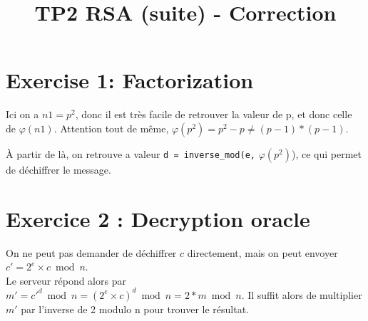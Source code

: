 \documentclass[english,a4paper,11pt,fleqn]{exam}
\title{\textbf{TP2 RSA (suite) - Correction}}
\begin{document}
	
	\section*{Exercise 1: Factorization}
	
	Ici on a $n1 = p^2$, donc il est très facile de retrouver la valeur de p, et donc celle de $\varphi(n1)$.
	Attention tout de même, $\varphi(p^2) = p^2 - p\neq (p-1)*(p-1)$.

	À partir de là, on retrouve a valeur \texttt{d = inverse\_mod(e,}  $\varphi(p^2)$), ce qui permet de déchiffrer le message.
	
	\section*{Exercice 2 : Decryption oracle}

	On ne peut pas demander de déchiffrer $c$ directement, mais on peut envoyer $c' = 2^e \times c \bmod n$.\\
	Le serveur répond alors par $m' = c'^d\bmod n = (2^e \times c)^d \bmod n = 2*m\bmod n$. 
	Il suffit alors de multiplier $m'$ par l'inverse de 2 modulo n pour trouver le résultat.
\end{document}
